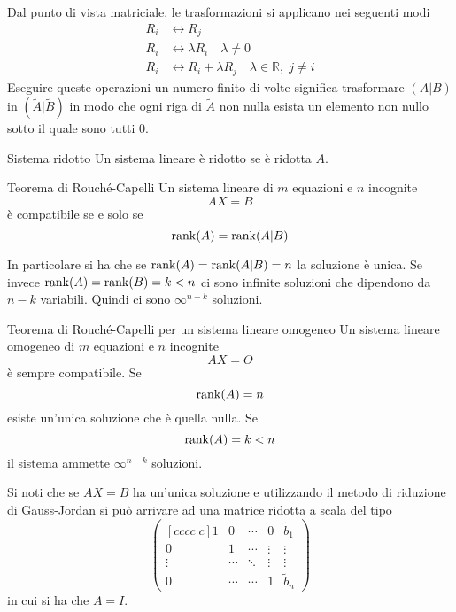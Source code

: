 Dal punto di vista matriciale, le trasformazioni si applicano nei seguenti modi
\begin{align*}
  R_i &\leftrightarrow R_j\\
  R_i &\leftrightarrow \lambda R_i\quad\lambda\neq0\\
  R_i &\leftrightarrow R_i+\lambda R_j\quad\lambda\in\mathbb{R},\;j\neq i
\end{align*}
Eseguire queste operazioni un numero finito di volte significa trasformare $(A\vert B)$
in $(\widetilde{A}\vert\widetilde{B})$ in modo che ogni riga di $\widetilde{A}$ non
nulla esista un elemento non nullo sotto il quale sono tutti $0$.

\begin{Def}{Sistema ridotto}
  Un sistema lineare è ridotto se è ridotta $A$.
\end{Def}

\begin{Thm}{Teorema di Rouché-Capelli}\label{thm:lineare_rouche-capelli}
  Un sistema lineare di $m$ equazioni e $n$ incognite
  \begin{equation*}
    AX = B
  \end{equation*}
  è compatibile se e solo se
  \begin{equation*}
    \rank(A) = \rank(A\vert B)
  \end{equation*}
\end{Thm}

In particolare si ha che se $\rank(A)=\rank(A\vert B)=n$ la soluzione è unica. Se invece
$\rank(A)=\rank(B)=k<n$ ci sono infinite soluzioni che dipendono da $n-k$ variabili.
Quindi ci sono $\infty^{n-k}$ soluzioni.

\begin{SubThm}{Teorema di Rouché-Capelli per un sistema lineare omogeneo}
  Un sistema lineare omogeneo di $m$ equazioni e $n$ incognite
  \begin{equation*}
    AX = O
  \end{equation*}
  è sempre compatibile. Se
  \begin{equation*}
    \rank(A) = n
  \end{equation*}
  esiste un'unica soluzione che è quella nulla. Se
  \begin{equation*}
    \rank(A) = k < n
  \end{equation*}
  il sistema ammette $\infty^{n-k}$ soluzioni.
\end{SubThm}

Si noti che se $AX=B$ ha un'unica soluzione e utilizzando il metodo di riduzione di
Gauss-Jordan si può arrivare ad una matrice ridotta a scala del tipo
\begin{equation*}
  \begin{pmatrix}[cccc|c]
    1 & 0 & \cdots & 0 & \tilde{b}_1\\
    0 & 1 & \cdots & \vdots & \vdots\\
    \vdots & \cdots & \ddots & \vdots & \vdots\\
    0 & \cdots & \cdots & 1 & \tilde{b}_n
  \end{pmatrix}
\end{equation*}
in cui si ha che $A=I$.


